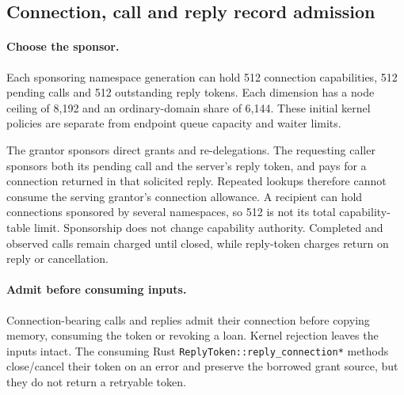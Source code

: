 \subsection{Connection, call and reply record admission}

\paragraph*{Choose the sponsor.}

Each sponsoring namespace generation can hold 512 connection capabilities,
512 pending calls and 512 outstanding reply tokens. Each dimension has a node
ceiling of 8,192 and an ordinary-domain share of 6,144. These initial kernel
policies are separate from endpoint queue capacity and waiter limits.

The grantor sponsors direct grants and re-delegations. The requesting caller
sponsors both its pending call and the server's reply token, and pays for a
connection returned in that solicited reply. Repeated lookups therefore cannot
consume the serving grantor's connection allowance. A recipient can hold
connections sponsored by several namespaces, so 512 is not its total
capability-table limit. Sponsorship does not change capability authority.
Completed and observed calls remain charged until closed, while reply-token
charges return on reply or cancellation.

\paragraph*{Admit before consuming inputs.}

Connection-bearing calls and replies admit their
connection before copying memory, consuming the token or revoking a loan.
Kernel rejection leaves the inputs intact. The consuming Rust
\texttt{ReplyToken::\allowbreak reply\_connection*} methods close/cancel their token on an
error and preserve the borrowed grant source, but they do not return a retryable
token.

